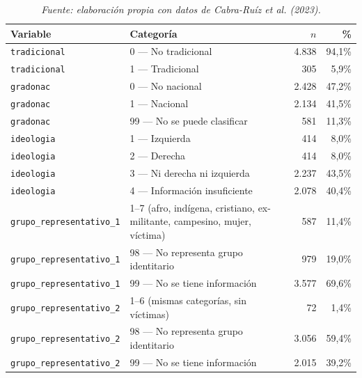 \documentclass[11pt,letterpaper]{article}
\newcommand{\code}[1]{\texttt{\small #1}}
\begin{document}
\begin{table}[htbp]
\centering
\footnotesize
\caption{Distribución de variables categóricas ($n=5{.}143$)}
\label{tab:A2}
\begin{tabular}{@{}p{3.1cm}p{8.6cm}rr@{}}
\toprule
Variable & Categoría & $n$ & \% \\
\midrule
\code{tradicional} & 0 --- No tradicional & 4.838 & 94,1\% \\
\code{tradicional} & 1 --- Tradicional & 305 & 5,9\% \\
\code{gradonac} & 0 --- No nacional & 2.428 & 47,2\% \\
\code{gradonac} & 1 --- Nacional & 2.134 & 41,5\% \\
\code{gradonac} & 99 --- No se puede clasificar & 581 & 11,3\% \\
\code{ideologia} & 1 --- Izquierda & 414 & 8,0\% \\
\code{ideologia} & 2 --- Derecha & 414 & 8,0\% \\
\code{ideologia} & 3 --- Ni derecha ni izquierda & 2.237 & 43,5\% \\
\code{ideologia} & 4 --- Información insuficiente & 2.078 & 40,4\% \\
\code{grupo\_re\-pre\-sen\-ta\-ti\-vo\_1} & 1--7 (afro, indígena, cristiano, ex-militante, campesino, mujer, víctima) & 587 & 11,4\% \\
\code{grupo\_re\-pre\-sen\-ta\-ti\-vo\_1} & 98 --- No representa grupo identitario & 979 & 19,0\% \\
\code{grupo\_re\-pre\-sen\-ta\-ti\-vo\_1} & 99 --- No se tiene información & 3.577 & 69,6\% \\
\code{grupo\_re\-pre\-sen\-ta\-ti\-vo\_2} & 1--6 (mismas categorías, sin víctimas) & 72 & 1,4\% \\
\code{grupo\_re\-pre\-sen\-ta\-ti\-vo\_2} & 98 --- No representa grupo identitario & 3.056 & 59,4\% \\
\code{grupo\_re\-pre\-sen\-ta\-ti\-vo\_2} & 99 --- No se tiene información & 2.015 & 39,2\% \\
\bottomrule
\end{tabular}
\vspace{0.3em}
\caption*{\footnotesize\color{mutedgray}\itshape Fuente: elaboración propia con datos de Cabra-Ruíz et al. (2023).}
\end{table}
\end{document}

